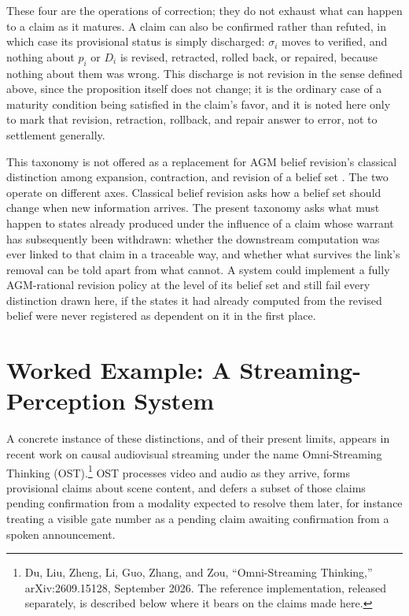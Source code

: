 \documentclass[11pt]{article}
\begin{document}
These four are the operations of correction; they do not exhaust what can happen to a claim as it matures. A claim can also be confirmed rather than refuted, in which case its provisional status is simply discharged: $\sigma_i$ moves to verified, and nothing about $p_i$ or $D_i$ is revised, retracted, rolled back, or repaired, because nothing about them was wrong. This discharge is not revision in the sense defined above, since the proposition itself does not change; it is the ordinary case of a maturity condition being satisfied in the claim's favor, and it is noted here only to mark that revision, retraction, rollback, and repair answer to error, not to settlement generally.

This taxonomy is not offered as a replacement for AGM belief revision's classical distinction among expansion, contraction, and revision of a belief set \cite{AGM1985}. The two operate on different axes. Classical belief revision asks how a belief set should change when new information arrives. The present taxonomy asks what must happen to states already produced under the influence of a claim whose warrant has subsequently been withdrawn: whether the downstream computation was ever linked to that claim in a traceable way, and whether what survives the link's removal can be told apart from what cannot. A system could implement a fully AGM-rational revision policy at the level of its belief set and still fail every distinction drawn here, if the states it had already computed from the revised belief were never registered as dependent on it in the first place.

\section{Worked Example: A Streaming-Perception System}

A concrete instance of these distinctions, and of their present limits, appears in recent work on causal audiovisual streaming under the name Omni-Streaming Thinking (OST).\footnote{Du, Liu, Zheng, Li, Guo, Zhang, and Zou, ``Omni-Streaming Thinking,'' arXiv:2609.15128, September 2026. The reference implementation, released separately, is described below where it bears on the claims made here.} OST processes video and audio as they arrive, forms provisional claims about scene content, and defers a subset of those claims pending confirmation from a modality expected to resolve them later, for instance treating a visible gate number as a pending claim awaiting confirmation from a spoken announcement.
\end{document}
